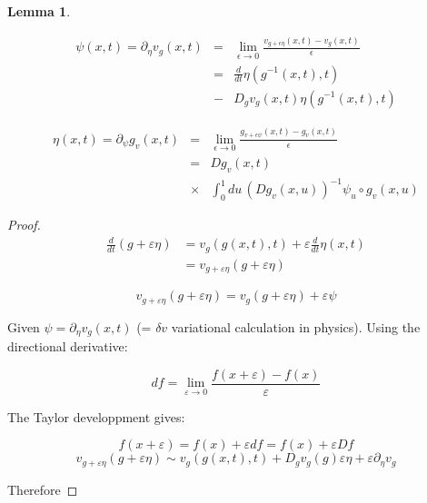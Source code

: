 \documentclass[final, paper=letter,5p,times,twocolumn]{elsarticle}
\theoremstyle{definition}
\newtheorem{lemma}[theorem]{Lemma}
\begin{document}
{\begin{lemma}
\label{lemma}

\begin{eqnarray*}
\psi(x,t) = \partial_{\eta} v_{g}(x,t) & = & \underset{\epsilon \rightarrow 0}{\lim} \frac{v_{g+\epsilon \eta}(x,t) - v_{g}(x,t)}{\epsilon} \\
& = & \frac{d}{dt} \eta(g^{-1}(x,t),t) \\
& - & D_{g} v_{g}(x,t) \eta (g^{-1}(x,t),t)
\end{eqnarray*}

\begin{equation}
  \begin{array}{lcl}
\eta(x,t) = \partial_{\psi} g_{v}(x,t) & = & \underset{\epsilon \rightarrow 0}{\lim} \frac{g_{v + \epsilon \psi}(x,t) - g_{v}(x,t)}{\epsilon} \\
& = & Dg_{v}(x,t) \\
& \times & \int_{0}^{1} du \, (Dg_{v}(x,u))^{-1} \psi_{u} \circ g_{v}(x,u)
\end{array}
\label{lemma_eq}
\end{equation}
\end{lemma}

\begin{proof}
  \begin{equation*}
    \begin{split}
      \frac{d}{dt} (g+\varepsilon \eta) & =  v_{g}(g(x,t),t) + \varepsilon \frac{d}{dt} \eta(x,t) \\
      & = v_{g+\varepsilon \eta}(g+\varepsilon \eta)
    \end{split}
  \end{equation*}

  $$
  v_{g+\varepsilon \eta}(g+\varepsilon \eta) = v_{g}(g+\varepsilon \eta) + \varepsilon \psi
  $$

  Given $\psi = \partial_{\eta} v_{g} (x,t)$ (= $\delta v$ variational calculation in physics). Using the directional derivative:

  $$
  df = \underset{\varepsilon \rightarrow 0}{\lim} \frac{f(x + \varepsilon) - f(x)}{\varepsilon}
  $$

  The Taylor developpment gives:

  $$
  f(x + \varepsilon) = f(x) + \varepsilon df = f(x) + \varepsilon Df
  $$
  $$
  v_{g+\varepsilon \eta}(g+\varepsilon \eta) \sim v_{g}(g(x,t),t) + D_{g} v_{g}(g) \varepsilon \eta + \varepsilon \partial_{\eta} v_{g}
  $$
  
Therefore 


\end{proof}}
\end{document}
